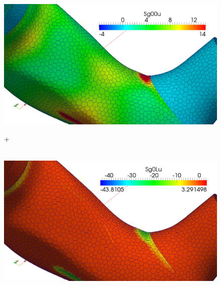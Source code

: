 \documentclass[8pt]{beamer}
\begin{document}
{\begin{figure}[htbp]
\begin{minipage}[b]{3.4 cm}
\centering
    \includegraphics[scale=0.07]{RLRioJ12_Sg0.png}
  \end{minipage}
    \begin{minipage}[b]{0.1 cm}
   +\\$ $\\
  \end{minipage}
    \begin{minipage}[b]{3 cm}
    \includegraphics[scale=0.07]{RLRioJ12_SgB.png}
  \end{minipage}
  \label{GCio4}
\end{figure}
}
\end{document}
